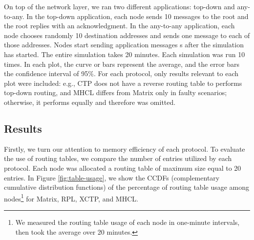 \begin{table}[!t]
\centering
\caption{Faulty network scenarios}
\label{tab:scn}
\end{table}

On top of the network layer, we ran two different applications: top-down and any-to-any. In the top-down application, each node sends 10 messages to the root and the root replies with an acknowledgment. In the any-to-any application, each node chooses randomly 10 destination addresses and sends one message to each of those addresses. Nodes start sending application messages \unit[90]{s} after the simulation has started. The entire simulation takes 20 minutes. Each simulation was run 10 times. In each plot, the curve or bars represent the average, and the error bars the confidence interval of 95\%. For each protocol, only results relevant to each plot were included: e.g., CTP does not have a reverse routing table to performs top-down routing, and MHCL differs from Matrix only in faulty scenarios; otherwise, it performs equally and therefore was omitted.

\subsection{Results}\label{subsec:res}

Firstly, we turn our attention to memory efficiency of each protocol. To evaluate the use of routing tables, we compare the number of entries utilized by each protocol. Each node was allocated a routing table of maximum size equal to 20 entries. In Figure \ref{fig:table-usage}, we show the CCDFs (complementary cumulative distribution functions) of the percentage of routing table usage among nodes\footnote{We measured the routing table usage of each node in one-minute intervals, then took the average over 20 minutes.} for Matrix, RPL, XCTP, and MHCL.

